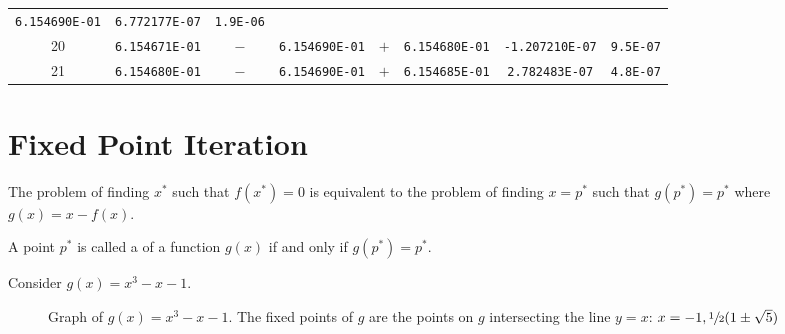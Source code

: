 \begin{example}
\begin{longtable}[t]{c|c|c|c|c|c|c|c}
        \texttt{6.154690E-01} & \texttt{6.772177E-07}  & \texttt{1.9E-06} \\
        20                    &
        \texttt{6.154671E-01} & \(-\)                  &
        \texttt{6.154690E-01} & \(+\)                  &
        \texttt{6.154680E-01} & \texttt{-1.207210E-07} & \texttt{9.5E-07} \\
        21                    &
        \texttt{6.154680E-01} & \(-\)                  &
        \texttt{6.154690E-01} & \(+\)                  &
        \texttt{6.154685E-01} & \texttt{2.782483E-07}  & \texttt{4.8E-07}
    \end{longtable}
\end{example}

\section{Fixed Point Iteration}

\begin{note}
    The problem of finding \( x^\ast \) such that \( f(x^\ast) = 0 \) is equivalent to the problem of finding \( x = p^\ast \) such that \( g(p^\ast) = p^\ast \) where \( g(x) = x - f(x) \).
\end{note}

\begin{definition}
    A point \( p^\ast \) is called a  of a function \( g(x) \) if and only if \( g(p^\ast) = p^\ast \).
\end{definition}

\begin{example}
    Consider \( g(x) = x^3 - x - 1 \).
    \begin{figure}[H]
        \centering
        \caption{Graph of \( g(x) = x^3 - x - 1 \). The fixed points of \( g \) are the points on \( g \) intersecting the line \( y = x \): \( x = -1, \sfrac{1}{2}(1 \pm \sqrt5) \)}
    \end{figure}
\end{example}

